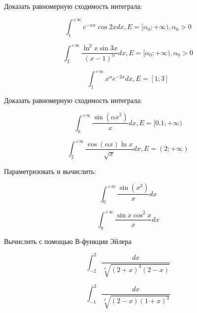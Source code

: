 \documentclass[russian]{article}
\begin{document}
Доказать равномерную сходимость интеграла:

$$ \int_1^{+\infty} e^{-\alpha x} \cos{2x} dx, E = [\alpha_0; +\infty), \alpha_0 > 0 $$

$$ \int_2^{+\infty} \frac{\ln^2x \sin{3x}}{(x - 1)^\alpha} dx , E = [\alpha_0; +\infty), \alpha_0 > 0 $$

$$ \int_1^{+\infty} x^\alpha e^{-2x} dx , E = [1; 3] $$

Доказать равномерную сходимость интеграла:

$$ \int_0^{+\infty} \frac{\sin(\alpha x^5)}{x} dx, E = [0.1;+\infty) $$

$$ \int_2^{+\infty} \frac{\cos(\alpha x) \ln x}{\sqrt{x}} dx, E = (2; +\infty) $$

Параметризовать и вычислить:

$$ \int_0^{+\infty} \frac{\sin(x^3)}{x} dx $$

$$ \int_0^{+\infty} \frac{\sin{x}\cos^2x}{x} dx $$

Вычислить с помощью В-функции Эйлера

$$ \int_{-2}^2 \frac{dx}{\sqrt[4]{(2 + x)^3(2 - x)}}$$

$$ \int_{-1}^2 \frac{dx}{\sqrt[4]{(2 - x)(1 + x)^3}}$$
\end{document}
